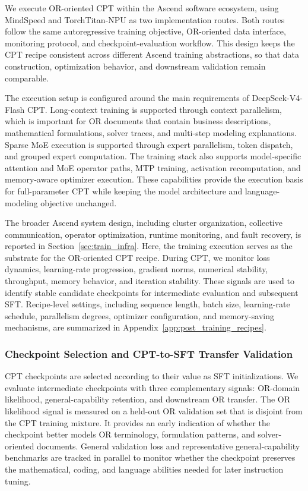 We execute OR-oriented CPT within the Ascend software ecosystem, using
MindSpeed and TorchTitan-NPU as two implementation routes. Both routes follow
the same autoregressive training objective, OR-oriented data interface,
monitoring protocol, and checkpoint-evaluation workflow. This design keeps the
CPT recipe consistent across different Ascend training abstractions, so that
data construction, optimization behavior, and downstream validation remain
comparable.

The execution setup is configured around the main requirements of
DeepSeek-V4-Flash CPT. Long-context training is supported through context
parallelism, which is important for OR documents that contain business
descriptions, mathematical formulations, solver traces, and multi-step
modeling explanations. Sparse MoE execution is supported through expert
parallelism, token dispatch, and grouped expert computation. The training stack
also supports model-specific attention and MoE operator paths, MTP training,
activation recomputation, and memory-aware optimizer execution. These
capabilities provide the execution basis for full-parameter CPT while keeping
the model architecture and language-modeling objective unchanged.

The broader Ascend system design, including cluster organization, collective
communication, operator optimization, runtime monitoring, and fault recovery,
is reported in Section~\ref{sec:train_infra}. Here, the training execution
serves as the substrate for the OR-oriented CPT recipe. During CPT, we monitor
loss dynamics, learning-rate progression, gradient norms, numerical stability,
throughput, memory behavior, and iteration stability. These signals are used to
identify stable candidate checkpoints for intermediate evaluation and
subsequent SFT. Recipe-level settings, including sequence length, batch size,
learning-rate schedule, parallelism degrees, optimizer configuration, and
memory-saving mechanisms, are summarized in
Appendix~\ref{app:post_training_recipes}.

\subsubsection{Checkpoint Selection and CPT-to-SFT Transfer Validation}
\label{subsubsec:cpt_checkpoint_selection}

CPT checkpoints are selected according to their value as SFT initializations.
We evaluate intermediate checkpoints with three complementary signals:
OR-domain likelihood, general-capability retention, and downstream OR transfer.
The OR likelihood signal is measured on a held-out OR validation set that is
disjoint from the CPT training mixture. It provides an early indication of
whether the checkpoint better models OR terminology, formulation patterns, and
solver-oriented documents. General validation loss and representative
general-capability benchmarks are tracked in parallel to monitor whether the
checkpoint preserves the mathematical, coding, and language abilities needed
for later instruction tuning.

